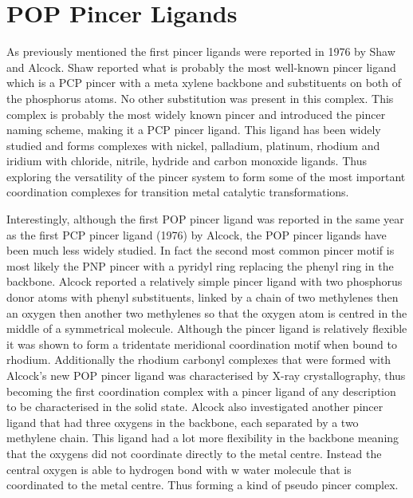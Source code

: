 \section{POP Pincer Ligands}

As previously mentioned the first pincer ligands were reported in 1976 by Shaw and Alcock.  Shaw reported what is probably the most well-known pincer ligand which is a PCP pincer with a meta xylene backbone and \tBu{} substituents on both of the phosphorus atoms.  No other substitution was present in this complex.  This complex is probably the most widely known pincer and introduced the pincer naming scheme, making it a PCP pincer ligand.  This ligand has been widely studied and forms complexes with nickel, palladium, platinum, rhodium and iridium with chloride, nitrile, hydride and carbon monoxide ligands.  Thus exploring the versatility of the pincer system to form some of the most important coordination complexes for transition metal catalytic transformations. 

Interestingly, although the first POP pincer ligand was reported in the same year as the first PCP pincer ligand (1976) by Alcock, the POP pincer ligands have been much less widely studied.  In fact the second most common pincer motif is most likely the PNP pincer with a pyridyl ring replacing the phenyl ring in the backbone.  Alcock reported a relatively simple pincer ligand with two phosphorus donor atoms with phenyl substituents, linked by a chain of two methylenes then an oxygen then another two methylenes so that the oxygen atom is centred in the middle of a symmetrical molecule.  Although the pincer ligand is relatively flexible it was shown to form a tridentate meridional coordination motif when bound to rhodium.  Additionally the rhodium carbonyl complexes that were formed with Alcock's new POP pincer ligand was characterised by X-ray crystallography, thus becoming the first coordination complex with a pincer ligand of any description to be characterised in the solid state.  Alcock also investigated another pincer ligand that had three oxygens in the backbone, each separated by a two methylene chain.  This ligand had a lot more flexibility in the backbone meaning that the oxygens did not coordinate directly to the metal centre.  Instead the central oxygen is able to hydrogen bond with w water molecule that is coordinated to the metal centre.  Thus forming a kind of pseudo pincer complex.

